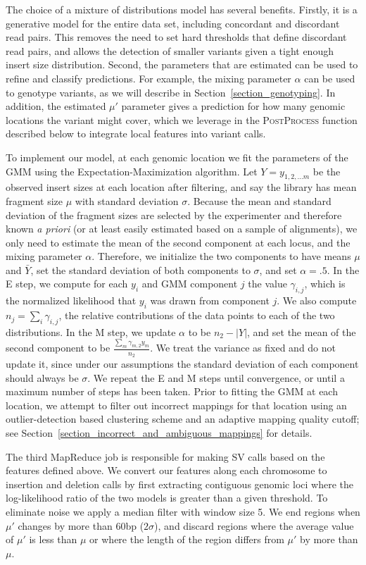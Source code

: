\begin{description}
The choice of a mixture of distributions model has several benefits. Firstly, it is a generative model for the entire data set, including concordant and discordant read pairs. This removes the need to set hard thresholds that define discordant read pairs, and allows the detection of smaller variants given a tight enough insert size distribution. Second, the parameters that are estimated can be used to refine and classify predictions. For example, the mixing parameter $\alpha$ can be used to genotype variants, as we will describe in Section~\ref{section_genotyping}. In addition, the estimated $\mu'$ parameter gives a prediction for how many genomic locations the variant might cover, which we leverage in the \textsc{PostProcess} function described below to integrate local features into variant calls.

To implement our model, at each genomic location we fit the parameters of the GMM using the Expectation-Maximization algorithm. Let $Y = y_{1,2, \ldots m}$ be the observed insert sizes at each location after filtering, and say the library has mean fragment size $\mu$ with standard deviation $\sigma$. Because the mean and standard deviation of the fragment sizes are selected by the experimenter and therefore known \emph{a priori} (or at least easily estimated based on a sample of alignments), we only need to estimate the mean of the second component at each locus, and the mixing parameter $\alpha$. Therefore, we initialize the two components to have means $\mu$ and $\bar{Y}$, set the standard deviation of both components to $\sigma$, and set $\alpha = .5$. In the E step, we compute for each $y_i$ and GMM component $j$ the value $\gamma_{i,j}$, which is the normalized likelihood that $y_i$ was drawn from component $j$. We also compute $n_j = \sum_i{\gamma_{i,j}}$, the relative contributions of the data points to each of the two distributions. In the M step, we update $\alpha$ to be $n_2 - \left|Y\right|$, and set the mean of the second component to be $\frac{\sum_m{\gamma_{m,2}y_m}}{n_2}$. We treat the variance as fixed and do not update it, since under our assumptions the standard deviation of each component should always be $\sigma$. We repeat the E and M steps until convergence, or until a maximum number of steps has been taken. Prior to fitting the GMM at each location, we attempt to filter out incorrect mappings for that location using an outlier-detection based clustering scheme and an adaptive mapping quality cutoff; see Section~\ref{section_incorrect_and_ambiguous_mappings} for details.

\item[\sc{PostProcess}] The third MapReduce job is responsible for making SV calls based on the features defined above. We convert our features along each chromosome to insertion and deletion calls by first extracting contiguous genomic loci where the log-likelihood ratio of the two models is greater than a given threshold. To eliminate noise we apply a median filter with window size 5. We end regions when $\mu'$ changes by more than 60bp ($2\sigma$), and discard regions where the average value of $\mu'$ is less than $\mu$ or where the length of the region differs from $\mu'$ by more than $\mu$.
\end{description}

